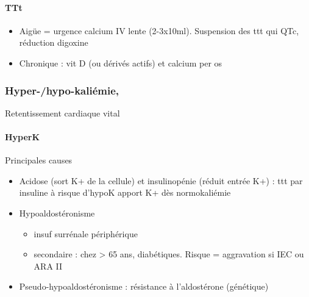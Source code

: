 \documentclass[11pt]{article}
\begin{document}
\paragraph{TTt}
\label{sec:org54d9526}
\begin{itemize}
\item Aigüe = urgence  \thus calcium IV lente (2-3x10ml). Suspension des ttt qui \inc
QTc, réduction digoxine
\item Chronique : vit D (ou dérivés actifs) et calcium per os
\end{itemize}

\subsubsection{Hyper-/hypo-kaliémie,}
\label{sec:orga27c026}
Retentissement cardiaque \thus vital 

\paragraph{HyperK}
\label{sec:orga7c663c}
Principales causes
\begin{itemize}
\item Acidose (sort K+ de la cellule) et insulinopénie (réduit entrée K+) : ttt par
insuline à risque d'hypoK \danger \thus apport K+ dès normokaliémie
\item Hypoaldostéronisme
\begin{itemize}
\item insuf surrénale périphérique
\item secondaire : chez > 65 ans, diabétiques. Risque = aggravation si IEC ou ARA II
\end{itemize}
\item Pseudo-hypoaldostéronisme : résistance à l'aldostérone (génétique)
\end{itemize}
\end{document}
